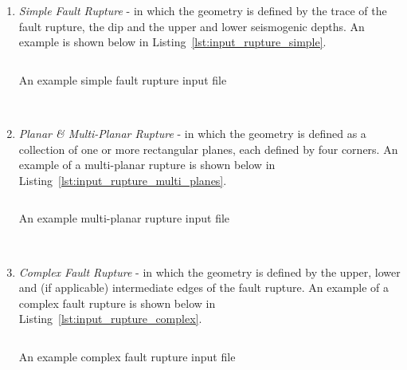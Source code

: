 \begin{enumerate}

    \item \emph{Simple Fault Rupture} - in which the geometry is defined by the
    trace of the fault rupture, the dip and the upper and lower seismogenic
    depths. An example is shown below in Listing~\ref{lst:input_rupture_simple}.

\begin{listing}[htbp]
  \inputminted[firstline=1,firstnumber=1,fontsize=\footnotesize,frame=single,linenos,bgcolor=lightgray]{xml}{oqum/hazard/verbatim/input_rupture_simple_fault.xml}
  \caption{An example simple fault rupture input file}
  \label{lst:input_rupture_simple}
\end{listing}
\\
    \item \emph{Planar \& Multi-Planar Rupture} - in which the geometry is
    defined as a collection of one or more rectangular planes, each defined
    by four corners. An example of a multi-planar rupture is shown below
    in Listing~\ref{lst:input_rupture_multi_planes}.

\begin{listing}[htbp]
  \inputminted[firstline=1,firstnumber=1,fontsize=\footnotesize,frame=single,linenos,bgcolor=lightgray]{xml}{oqum/hazard/verbatim/input_rupture_multi_planes.xml}
  \caption{An example multi-planar rupture input file}
  \label{lst:input_rupture_multi_planes}
\end{listing}
\\
    \item \emph{Complex Fault Rupture} - in which the geometry is defined by
    the upper, lower and (if applicable) intermediate edges of the fault
    rupture. An example of a complex fault rupture is shown below in
    Listing~\ref{lst:input_rupture_complex}.

\begin{listing}[htbp]
  \inputminted[firstline=1,firstnumber=1,fontsize=\footnotesize,frame=single,linenos,bgcolor=lightgray]{xml}{oqum/hazard/verbatim/input_rupture_complex.xml}
  \caption{An example complex fault rupture input file}
  \label{lst:input_rupture_complex}
\end{listing}

\end{enumerate}